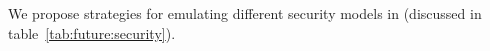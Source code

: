 We propose strategies for emulating different security models in \liboses{}  (discussed in table~\ref{tab:future:security}).










%

